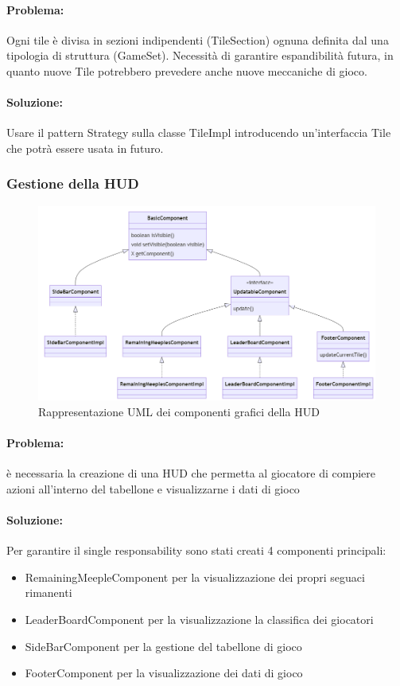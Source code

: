 \paragraph{Problema:}
Ogni tile è divisa in sezioni indipendenti (TileSection) ognuna definita dal una tipologia di struttura (GameSet). Necessità di garantire espandibilità futura, in quanto nuove Tile potrebbero prevedere anche nuove meccaniche di gioco.
\paragraph{Soluzione:}
Usare il pattern Strategy sulla classe TileImpl introducendo un'interfaccia Tile che potrà essere usata in futuro.
\clearpage

\subsubsection*{Gestione della HUD}
\begin{figure}[ht]
    \centering\includegraphics[scale=0.70]{images/HUD_uml2.png}
    \caption{Rappresentazione UML dei componenti grafici della HUD}
\end{figure}

\paragraph{Problema:}
è necessaria la creazione di una HUD che permetta al giocatore di compiere azioni all'interno del tabellone e visualizzarne i dati di gioco

\paragraph{Soluzione:}
Per garantire il single responsability sono stati creati 4 componenti principali:
\begin{itemize}
    \item RemainingMeepleComponent per la visualizzazione dei propri seguaci rimanenti
    \item LeaderBoardComponent per la visualizzazione la classifica dei giocatori 
    \item SideBarComponent per la gestione del tabellone di gioco
    \item FooterComponent per la visualizzazione dei dati di gioco
\end{itemize}

